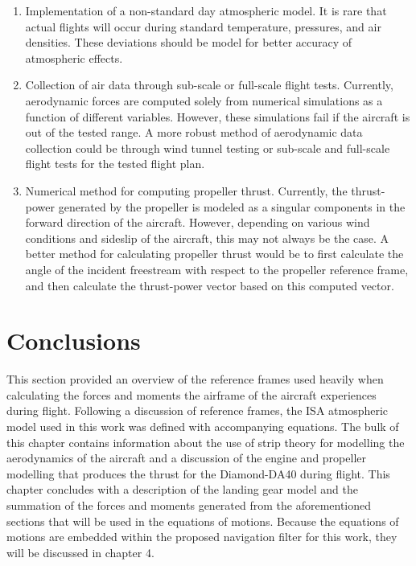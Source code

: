 \begin{enumerate}
    \item Implementation of a non-standard day atmospheric model. It is rare that actual flights will occur during standard temperature, pressures, and air densities. These deviations should be model for better accuracy of atmospheric effects.
    
    \item Collection of air data through sub-scale or full-scale flight tests. Currently, aerodynamic forces are computed solely from numerical simulations as a function of different variables. However, these simulations fail if the aircraft is out of the tested range. A more robust method of aerodynamic data collection could be through wind tunnel testing or sub-scale and full-scale flight tests for the tested flight plan.
    
    \item Numerical method for computing propeller thrust. Currently, the thrust-power generated by the propeller is modeled as a singular components in the forward direction of the aircraft. However, depending on various wind conditions and sideslip of the aircraft, this may not always be the case. A better method for calculating propeller thrust would be to first calculate the angle of the incident freestream with respect to the propeller reference frame, and then calculate the thrust-power vector based on this computed vector.
\end{enumerate}


\section{\textbf{Conclusions}}

This section provided an overview of the reference frames used heavily when calculating the forces and moments the airframe of the aircraft experiences during flight. Following a discussion of reference frames, the ISA atmospheric model used in this work was defined with accompanying equations. The bulk of this chapter contains information about the use of strip theory for modelling the aerodynamics of the aircraft and a discussion of the engine and propeller modelling that produces the thrust for the Diamond-DA40 during flight. This chapter concludes with a description of the landing gear model and the summation of the forces and moments generated from the aforementioned sections that will be used in the equations of motions. Because the equations of motions are embedded within the proposed navigation filter for this work, they will be discussed in chapter 4.
\clearpage
